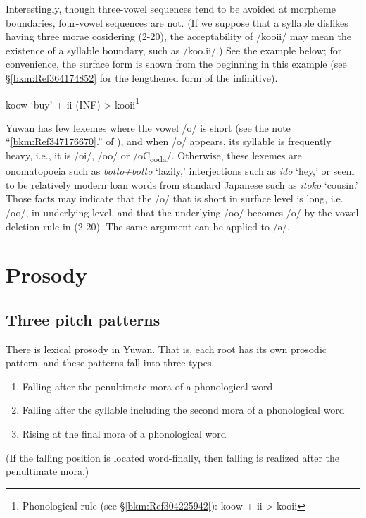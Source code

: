 Interestingly, though three-vowel sequences tend to be avoided at morpheme boundaries, four-vowel sequences are not. (If we suppose that a syllable dislikes having three morae cosidering (2-20), the acceptability of /kooii/ may mean the existence of a syllable boundary, such as /koo.ii/.) See the example below; for convenience, the surface form is shown from the beginning in this example (see §\ref{bkm:Ref364174852} for the lengthened form of the infinitive).

\ea koow  ‘buy’  +  ii  (INF)  >  kooii\footnote{Phonological rule (see §\ref{bkm:Ref304225942}): koow + ii > kooii} \z

Yuwan has few lexemes where the vowel /o/ is short (see the note “\ref{bkm:Ref347176670}.” of ), and when /o/ appears, its syllable is frequently heavy, i.e., it is /oi/, /oo/ or /oC\textsubscript{coda}/. Otherwise, these lexemes are onomatopoeia such as \textit{botto+botto} ‘lazily,’ interjections such as \textit{ido} ‘hey,’ or seem to be relatively modern loan words from standard Japanese such as \textit{itoko} ‘cousin.’ Those facts may indicate that the /o/ that is short in surface level is long, i.e. /oo/, in underlying level, and that the underlying /oo/ becomes /o/ by the vowel deletion rule in (2-20). The same argument can be applied to /ə/.

\section{Prosody}\label{bkm:Ref301560567}\hypertarget{RefHeadingToc395696983}{}
\subsection{Three pitch patterns}\label{bkm:Ref303982713}\hypertarget{RefHeadingToc395696984}{}

There is lexical prosody in Yuwan. That is, each root has its own prosodic pattern, and these patterns fall into three types.

\begin{enumerate}[label=\Roman*.]
\item Falling after the penultimate mora of a phonological word
\item Falling after the syllable including the second mora of a phonological word
\item Rising at the final mora of a phonological word
\end{enumerate}

(If the falling position is located word-finally, then falling is realized after the penultimate mora.)

